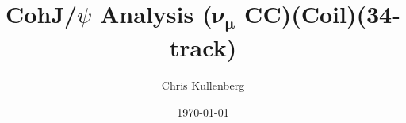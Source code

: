 \title{CohJ/$\psi$ Analysis ($\boldsymbol{\nu_\mu}$ \textbf{CC})(\textbf{Coil})(\textbf{34-track})}
\author{Chris Kullenberg}
\date{\today}
